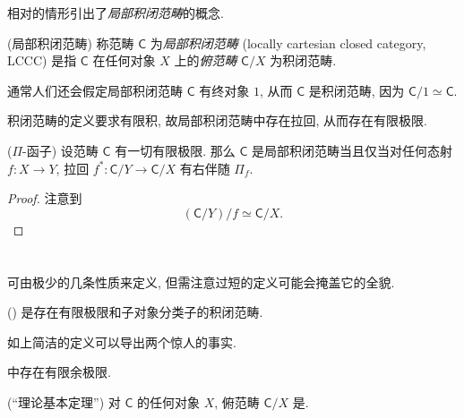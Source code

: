 相对的情形引出了\emph{局部积闭范畴}的概念.

\begin{definition}
    {(局部积闭范畴)}
    称范畴 $\mathsf C$ 为\emph{局部积闭范畴} (locally cartesian closed category, LCCC) 是指 $\mathsf C$ 在任何对象 $X$ 上的\emph{俯范畴} $\mathsf C /X$ 为积闭范畴.
\end{definition}

\begin{remark}
    {}
    通常人们还会假定局部积闭范畴 $\mathsf C$ 有终对象 $1$, 从而 $\mathsf C$ 是积闭范畴, 因为 $\mathsf C/1\simeq \mathsf C$.
    
    积闭范畴的定义要求有限积, 故局部积闭范畴中存在拉回, 从而存在有限极限.
\end{remark}

\begin{propdef}
	[label={pullback-has-right-adjoint}]
    {($\Pi$-函子)}
    设范畴 $\mathsf C$ 有一切有限极限. 那么 $\mathsf C$ 是局部积闭范畴当且仅当对任何态射 $f \colon X \to Y$,
    拉回 $f^* \colon \mathsf C/Y \to \mathsf C/X$ 有右伴随 $\Pi_f$.
\end{propdef}

\begin{proof}
    注意到
    $$
    (\mathsf C/Y)/f \simeq \mathsf C/X.
    $$
\end{proof}

\section{\topos{}}


\topos{}可由极少的几条性质来定义, 但需注意过短的定义可能会掩盖它的全貌.

\begin{definition}[label={topos-definition}]{(\topos{})}
    \emph{\topos{}}是存在有限极限和子对象分类子的积闭范畴.
\end{definition}

如上简洁的定义可以导出两个惊人的事实.

\begin{prop}
    {}
    \topos{}中存在有限余极限.
\end{prop}

\begin{prop}
    [label={over-category-topos}]
    {(``\topos{}理论基本定理'')}
    对\topos{} $\mathsf C$ 的任何对象 $X$, 俯范畴 $\mathsf C / X$ 是\topos{}.
\end{prop}

